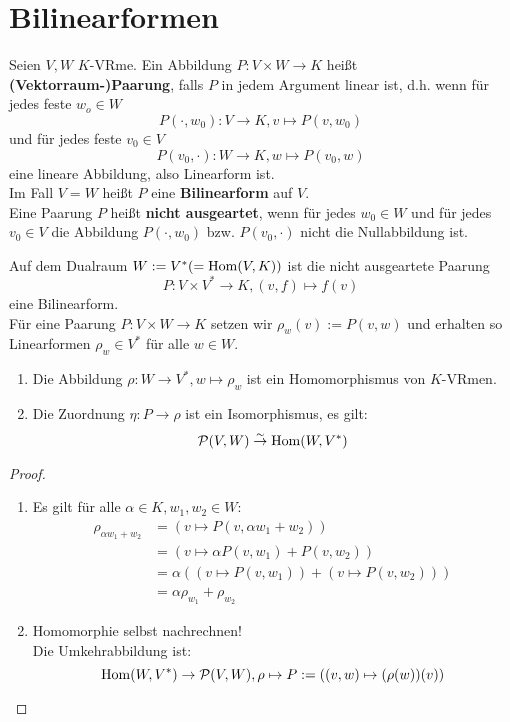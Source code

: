 \documentclass[parskip,a4paper,twoside,DIV15,BCOR12mm]{scrbook}
\begin{document}
\section{Bilinearformen}
\begin{definition}
Seien $V,W$ $K$-VRme. Ein Abbildung $P:V\times W\to K$ heißt \textbf{\mbox{(Vektorraum-)}Paarung},
falls $P$ in jedem Argument linear ist, d.h. wenn für jedes feste $w_o\in W$
\[P(\cdot,w_0):V\to K, v\mapsto P(v,w_0)\]
und für jedes feste $v_0\in V$
\[P(v_0,\cdot):W\to K, w\mapsto P(v_0,w)\]
eine lineare Abbildung, also Linearform ist.\\
Im Fall $V=W$ heißt $P$ eine \textbf{Bilinearform} auf $V$.\\
Eine Paarung $P$ heißt \textbf{nicht ausgeartet}, wenn für jedes $w_0\in W$ und
für jedes $v_0\in V$ die Abbildung $P(\cdot,w_0)$ bzw. $P(v_0,\cdot)$ nicht die Nullabbildung
ist.
\end{definition}

\begin{comment}
Die Menge $\mathcal{P}(V,W)$ aller Paarungen von $V$ und $W$ ist ein untervektorraum
des $K$-VRms $\Abb(V\times W,K)$ aller Abbildungen von $V\times W$ nach $K$.
\end{comment}

\begin{example}
Auf dem Dualraum $W:=V^*(=\operatorname{Hom}(V,K))$ ist die nicht ausgeartete Paarung
\[P:V\times V^*\to K,(v,f)\mapsto f(v)\]
eine Bilinearform.\\
Für eine Paarung $P:V\times W\to K$ setzen wir $\rho_w(v):=P(v,w)$ und erhalten
so Linearformen $\rho_w\in V^*$ für alle $w\in W$.
\end{example}

\begin{theo}
\begin{enumerate}
\item Die Abbildung $\rho:W\to V^*,w\mapsto \rho_w$ ist ein Homomorphismus
von $K$-VRmen.
\item Die Zuordnung $\eta:P\to \rho$ ist ein Isomorphismus, es gilt:
\[\mathcal{P}(V,W)\stackrel{\sim}{\to} \operatorname{Hom}(W,V^*)\]
\end{enumerate}
\end{theo}

\begin{proof}
\begin{enumerate}
\item Es gilt für alle $\alpha\in K,w_1,w_2\in W$:
\begin{align*}
\rho_{\alpha w_1+w_2}&=(v\mapsto P(v,\alpha w_1+w_2))\\
&=(v\mapsto \alpha P(v,w_1)+P(v,w_2))\\
&=\alpha((v\mapsto P(v,w_1))+(v\mapsto P(v,w_2)))\\
&=\alpha\rho_{w_1}+\rho_{w_2} 
\end{align*}
\item Homomorphie selbst nachrechnen!\\
Die Umkehrabbildung ist:
\[\operatorname{Hom}(W,V^*)\to \mathcal{P}(V,W),\rho\mapsto P:=((v,w)\mapsto(\rho(w))(v))\]
\end{enumerate}
\end{proof}
\end{document}
